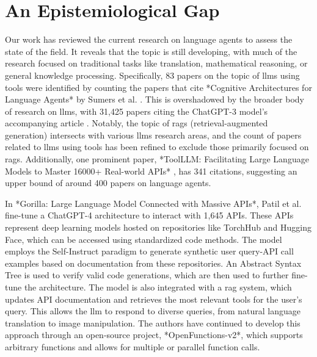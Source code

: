 \section{An Epistemiological Gap}

Our work has reviewed the current research on language agents to assess the state of the field. It reveals that the topic is still developing, with much of the research focused on traditional tasks like translation, mathematical reasoning, or general knowledge processing. Specifically, 83 papers on the topic of \glspl{llm} using tools were identified by counting the papers that cite *Cognitive Architectures for Language Agents* by Sumers et al. \cite{sumers2024cognitivearchitectureslanguageagents}. This is overshadowed by the broader body of research on \glspl{llm}, with 31,425 papers citing the ChatGPT-3 model's accompanying article \cite{gpt3}. Notably, the topic of \glspl{rag} (retrieval-augmented generation) intersects with various \glspl{llm} research areas, and the count of papers related to \glspl{llm} using tools has been refined to exclude those primarily focused on \glspl{rag}. Additionally, one prominent paper, *ToolLLM: Facilitating Large Language Models to Master 16000+ Real-world APIs* \cite{qin2023toolllmfacilitatinglargelanguage}, has 341 citations, suggesting an upper bound of around 400 papers on language agents.

\pskip

In *Gorilla: Large Language Model Connected with Massive APIs*, Patil et al. \cite{patil2023gorillalargelanguagemodel} fine-tune a ChatGPT-4 architecture to interact with 1,645 APIs. These APIs represent deep learning models hosted on repositories like TorchHub and Hugging Face, which can be accessed using standardized code methods. The model employs the Self-Instruct paradigm \cite{selfinstruct} to generate synthetic user query-API call examples based on documentation from these repositories. An Abstract Syntax Tree is used to verify valid code generations, which are then used to further fine-tune the architecture. The model is also integrated with a \gls{rag} system, which updates API documentation and retrieves the most relevant tools for the user's query. This allows the \gls{llm} to respond to diverse queries, from natural language translation to image manipulation. The authors have continued to develop this approach through an open-source project, *OpenFunctions-v2*, which supports arbitrary functions and allows for multiple or parallel function calls.

\pskip

